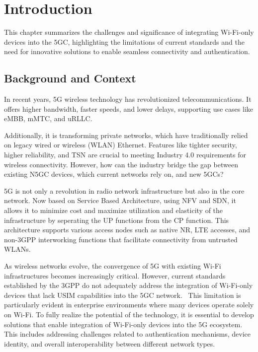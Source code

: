 \chapter{Introduction}%
\label{chapter:introduction}

\begin{introduction}
This chapter summarizes the challenges and significance of integrating Wi-Fi-only devices into the \ac{5GC}, highlighting the limitations of current standards and the need for innovative solutions to enable seamless connectivity and authentication.
\end{introduction}

\section{Background and Context}

In recent years, \ac{5G} wireless technology has revolutionized telecommunications. It offers higher bandwidth, faster speeds, and lower delays, supporting use cases like \ac{eMBB}, \ac{mMTC}, and \ac{uRLLC}.

Additionally, it is transforming private networks, which have traditionally relied on legacy wired or wireless (WLAN) Ethernet. Features like tighter security, higher reliability, and \ac{TSN} are crucial to meeting Industry 4.0 requirements for wireless connectivity. However, how can the industry bridge the gap between existing \ac{N5GC} devices, which current networks rely on, and new \acp{5GC}?

\ac{5G} is not only a revolution in radio network infrastructure but also in the core network. Now based on Service Based Architecture, using \ac{NFV} and \ac{SDN}, it allows it to minimize cost and maximize utilization and elasticity of the infrastructure by seperating the \ac{UP} functions from the \ac{CP} function. This architecture supports various access nodes such as native \ac{NR}, LTE accesses, and non-\ac{3GPP} interworking functions that facilitate connectivity from untrusted WLANs.~\cite{23.501-p41}

As wireless networks evolve, the convergence of 5G with existing Wi-Fi infrastructures becomes increasingly critical. However, current standards established by the \ac{3GPP} do not adequately address the integration of Wi-Fi-only devices that lack \ac{USIM} capabilities into the \ac{5GC} network.~\cite{wba-04-2021-p59} This limitation is particularly evident in enterprise environments where many devices operate solely on Wi-Fi. To fully realize the potential of the technology, it is essential to develop solutions that enable integration of Wi-Fi-only devices into the \ac{5G} ecosystem. This includes addressing challenges related to authentication mechanisms, device identity, and overall interoperability between different network types.

